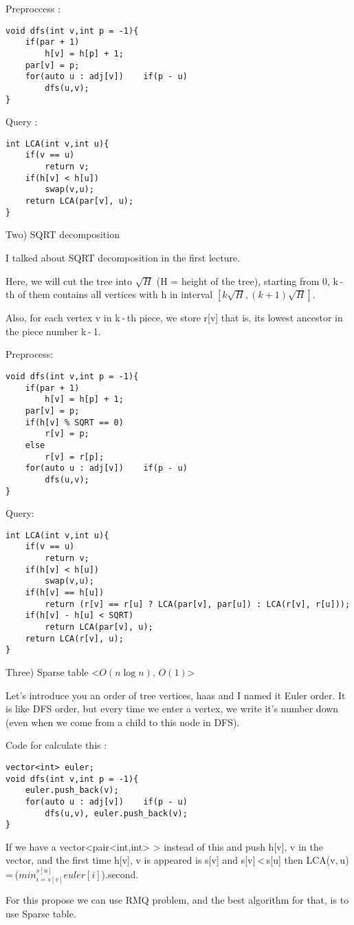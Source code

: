 Preproccess :
\begin{verbatim}
void dfs(int v,int p = -1){
	if(par + 1)
		h[v] = h[p] + 1;
	par[v] = p;
	for(auto u : adj[v])	if(p - u)
		dfs(u,v);
}
\end{verbatim}
Query :
\begin{verbatim}
int LCA(int v,int u){
	if(v == u)
		return v;
	if(h[v] < h[u])
		swap(v,u);
	return LCA(par[v], u);
}
\end{verbatim}
Two) SQRT decomposition 

I talked about SQRT decomposition in the first lecture.

Here, we will cut the tree into $\sqrt{H}$ (H = height of the tree), starting from 0, k - th of them contains all vertices with h in interval $[k\sqrt{H},(k+1)\sqrt{H}]$.

Also, for each vertex v in k - th piece, we store r[v] that is, its lowest ancestor in the piece number k - 1.

Preprocess:
\begin{verbatim}
void dfs(int v,int p = -1){
	if(par + 1)
		h[v] = h[p] + 1;
	par[v] = p;
	if(h[v] % SQRT == 0)
		r[v] = p;
	else
		r[v] = r[p];
	for(auto u : adj[v])	if(p - u)
		dfs(u,v);
}
\end{verbatim}
Query:
\begin{verbatim}
int LCA(int v,int u){
	if(v == u)
		return v;
	if(h[v] < h[u])
		swap(v,u);
	if(h[v] == h[u])
		return (r[v] == r[u] ? LCA(par[v], par[u]) : LCA(r[v], r[u]));
	if(h[v] - h[u] < SQRT)
		return LCA(par[v], u);
	return LCA(r[v], u);
}
\end{verbatim}
Three) Sparse table <$O(n\log{n})$, $O(1)$>

Let's introduce you an order of tree vertices, haas and I named it Euler order. It is like DFS order, but every time we enter a vertex, we write it's number down (even when we come from a child to this node in DFS).

Code for calculate this :
\begin{verbatim}
vector<int> euler;
void dfs(int v,int p = -1){
	euler.push_back(v);
	for(auto u : adj[v])	if(p - u)
		dfs(u,v), euler.push_back(v);
}
\end{verbatim}
If we have a vector<pair<int,int> > instead of this and push {h[v], v} in the vector, and the first time {h[v], v} is appeared is s[v] and s[v] < s[u] then LCA(v, u) = ($min_{i = s[v]}^{s[u]}euler[i]$).second.

For this propose we can use RMQ problem, and the best algorithm for that, is to use Sparse table.

